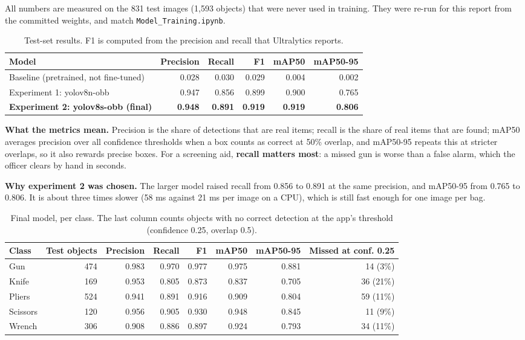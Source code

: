 \documentclass[11pt,a4paper]{article}
\newcommand{\code}[1]{\texttt{#1}}
\begin{document}
All numbers are measured on the 831 test images (1,593 objects) that were never used in training.
They were re-run for this report from the committed weights, and match \code{Model\_Training.ipynb}.

\begin{table}[H]
\centering
\small
\begin{tabular}{@{}lrrrrr@{}}
\toprule
Model & Precision & Recall & F1 & mAP50 & mAP50-95 \\
\midrule
Baseline (pretrained, not fine-tuned) & 0.028 & 0.030 & 0.029 & 0.004 & 0.002 \\
Experiment 1: yolov8n-obb & 0.947 & 0.856 & 0.899 & 0.900 & 0.765 \\
\textbf{Experiment 2: yolov8s-obb (final)} & \textbf{0.948} & \textbf{0.891} & \textbf{0.919} & \textbf{0.919} & \textbf{0.806} \\
\bottomrule
\end{tabular}
\caption{Test-set results. F1 is computed from the precision and recall that Ultralytics reports.}
\label{tab:results}
\end{table}

\textbf{What the metrics mean.} Precision is the share of detections that are real items; recall is
the share of real items that are found; mAP50 averages precision over all confidence thresholds when
a box counts as correct at 50\% overlap, and mAP50-95 repeats this at stricter overlaps, so it also
rewards precise boxes. For a screening aid, \textbf{recall matters most}: a missed gun is worse than a
false alarm, which the officer clears by hand in seconds.

\textbf{Why experiment 2 was chosen.} The larger model raised recall from 0.856 to 0.891 at the same
precision, and mAP50-95 from 0.765 to 0.806. It is about three times slower (58 ms against 21 ms per
image on a CPU), which is still fast enough for one image per bag.

\begin{table}[H]
\centering
\small
\begin{tabular}{@{}lrrrrrrr@{}}
\toprule
Class & Test objects & Precision & Recall & F1 & mAP50 & mAP50-95 & Missed at conf. 0.25 \\
\midrule
Gun      & 474 & 0.983 & 0.970 & 0.977 & 0.975 & 0.881 & 14 (3\%) \\
Knife    & 169 & 0.953 & 0.805 & 0.873 & 0.837 & 0.705 & 36 (21\%) \\
Pliers   & 524 & 0.941 & 0.891 & 0.916 & 0.909 & 0.804 & 59 (11\%) \\
Scissors & 120 & 0.956 & 0.905 & 0.930 & 0.948 & 0.845 & 11 (9\%) \\
Wrench   & 306 & 0.908 & 0.886 & 0.897 & 0.924 & 0.793 & 34 (11\%) \\
\bottomrule
\end{tabular}
\caption{Final model, per class. The last column counts objects with no correct detection at the
app's threshold (confidence 0.25, overlap 0.5).}
\label{tab:perclass}
\end{table}
\end{document}
